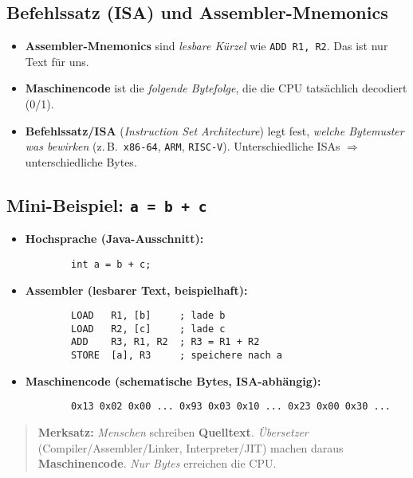 \documentclass[../skript/main.tex]{subfiles}
\begin{document}
\subsection{Befehlssatz (ISA) und Assembler-Mnemonics}
\begin{itemize}
	\item \textbf{Assembler-Mnemonics} sind \emph{lesbare Kürzel} wie \texttt{ADD R1, R2}. Das ist nur Text für uns.
	\item \textbf{Maschinencode} ist die \emph{folgende Bytefolge}, die die CPU tatsächlich decodiert (0/1).
	\item \textbf{Befehlssatz/ISA} (\emph{Instruction Set Architecture}) legt fest, \emph{welche Byte\-muster was bewirken}
	(z.\,B.\ \texttt{x86-64}, \texttt{ARM}, \texttt{RISC-V}). Unterschiedliche ISAs \(\Rightarrow\) unterschiedliche Bytes.
\end{itemize}

\subsection{Mini-Beispiel: \texttt{a = b + c}}
\begin{itemize}
	\item \textbf{Hochsprache (Java-Ausschnitt):}
	\begin{verbatim}
		int a = b + c;
	\end{verbatim}
	\item \textbf{Assembler (lesbarer Text, beispielhaft):}
	\begin{verbatim}
		LOAD   R1, [b]     ; lade b
		LOAD   R2, [c]     ; lade c
		ADD    R3, R1, R2  ; R3 = R1 + R2
		STORE  [a], R3     ; speichere nach a
	\end{verbatim}
	\item \textbf{Maschinencode (schematische Bytes, ISA-abhängig):}
	\begin{verbatim}
		0x13 0x02 0x00 ... 0x93 0x03 0x10 ... 0x23 0x00 0x30 ...
	\end{verbatim}
\end{itemize}



\begin{quote}\small
	\textbf{Merksatz:} \emph{Menschen} schreiben \textbf{Quelltext}. \emph{Übersetzer} (Compiler/Assembler/Linker, Interpreter/JIT)
	machen daraus \textbf{Maschinencode}. \emph{Nur Bytes} erreichen die CPU.
\end{quote}
\end{document}
